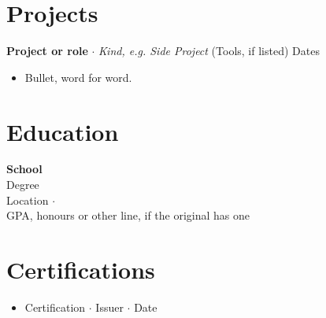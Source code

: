 \section*{Projects}

\textbf{{{Project or role}}} $\cdot$ \textit{{{Kind, e.g. Side Project}}} ({{Tools, if listed}}) \hfill {{Dates}}
\begin{itemize}
    \item {{Bullet, word for word.}}
\end{itemize}

\section*{Education}
\textbf{{{School}}} \\
{{Degree}} \\
{{Location}} \quad$\cdot$ \\
{{GPA, honours or other line, if the original has one}}

\section*{Certifications}
\begin{itemize}
    \item {{Certification}} $\cdot$ {{Issuer}} $\cdot$ {{Date}}
\end{itemize}


